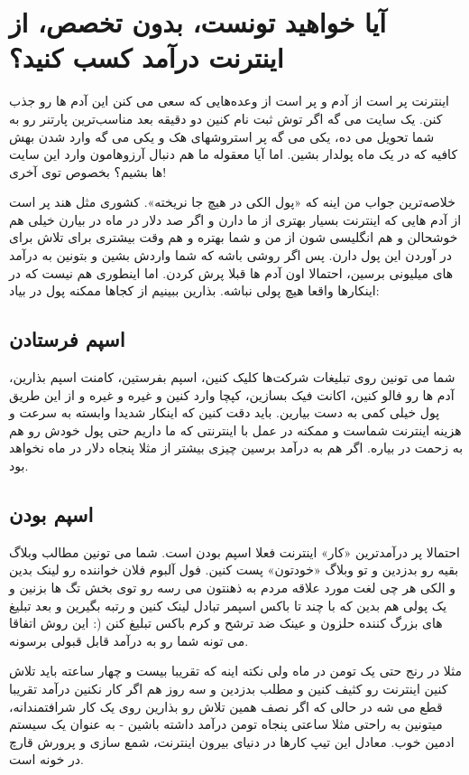 \section{آیا خواهید تونست، بدون تخصص، از اینترنت درآمد کسب کنید؟}
اینترنت پر است از آدم و پر است از وعده‌هایی که سعی می کنن این آدم ها رو جذب کنن. یک سایت می گه اگر توش ثبت نام کنین دو دقیقه بعد مناسب‌ترین پارتنر رو به شما تحویل می ده، یکی می گه پر استروشهای هک و یکی می گه وارد شدن بهش کافیه که در یک ماه پولدار بشین. اما آیا معقوله ما هم دنبال آرزوهامون وارد این سایت ها بشیم؟ بخصوص توی آخری!

خلاصه‌ترین جواب من اینه که «پول الکی در هیچ جا نریخته». کشوری مثل هند پر است از آدم هایی که اینترنت بسیار بهتری از ما دارن و اگر صد دلار در ماه در بیارن خیلی هم خوشحالن و هم انگلیسی شون از من و شما بهتره و هم وقت بیشتری برای تلاش برای در آوردن این پول دارن. پس اگر روشی باشه که شما واردش بشین و بتونین به درآمد های میلیونی برسین، احتمالا اون آدم ها قبلا پرش کردن. اما اینطوری هم نیست که در اینکارها واقعا هیچ پولی نباشه. بذارین ببینیم از کجاها ممکنه پول در بیاد:
\subsection*{اسپم فرستادن}
شما می تونین روی تبلیغات شرکت‌ها کلیک کنین، اسپم بفرستین، کامنت اسپم بذارین، آدم ها رو فالو کنین، اکانت فیک بسازین، کپچا وارد کنین و غیره و غیره و از این طریق پول خیلی کمی به دست بیارین. باید دقت کنین که اینکار شدیدا وابسته به سرعت و هزینه اینترنت شماست و ممکنه در عمل با اینترنتی که ما داریم حتی پول خودش رو هم به زحمت در بیاره. اگر هم به درآمد برسین چیزی بیشتر از مثلا پنجاه دلار در ماه نخواهد بود.
\subsection*{اسپم بودن}
احتمالا پر درآمدترین «کار» اینترنت فعلا اسپم بودن است. شما می تونین مطالب وبلاگ بقیه رو بدزدین و تو وبلاگ «خودتون» پست کنین. فول آلبوم فلان خواننده رو لینک بدین و الکی هر چی لغت مورد علاقه مردم به ذهنتون می رسه رو توی بخش تگ ها بزنین و یک پولی هم بدین که با چند تا باکس اسپمر تبادل لینک کنین و رتبه بگیرین و بعد تبلیغ های بزرگ کننده حلزون و عینک ضد ترشح و کرم باکس تبلیغ کنن (: این روش اتفاقا می تونه شما رو به درآمد قابل قبولی برسونه.

 مثلا در رنج حتی یک تومن در ماه ولی نکته اینه که تقریبا بیست و چهار ساعته باید تلاش کنین اینترنت رو کثیف کنین و مطلب بدزدین و سه روز هم اگر کار نکنین درآمد تقریبا قطع می شه در حالی که اگر نصف همین تلاش رو بذارین روی یک کار شرافتمندانه، میتونین به راحتی مثلا ساعتی پنجاه تومن درآمد داشته باشین - به عنوان یک سیستم ادمین خوب. معادل این تیپ کارها در دنیای بیرون اینترنت، شمع سازی و پرورش قارچ در خونه است.

